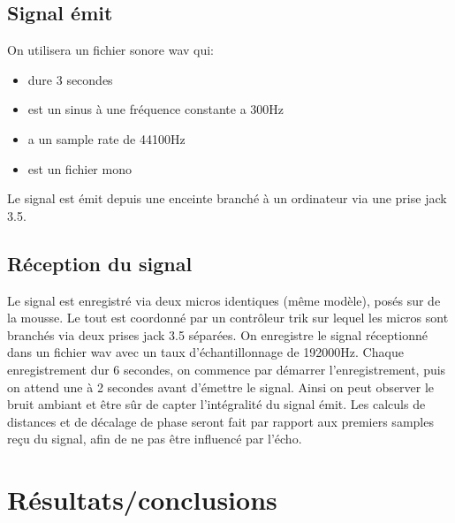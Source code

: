 \documentclass[12pt,a4paper]{article}
\begin{document}
\subsection{Signal émit}
On utilisera un fichier sonore wav qui:
\begin{itemize}
\item dure 3 secondes
\item est un sinus à une fréquence constante a 300Hz
\item a un sample rate de 44100Hz
\item est un fichier mono
\end{itemize}
Le signal est émit depuis une enceinte branché à un ordinateur via une prise jack 3.5.



\subsection{Réception du signal}
Le signal est enregistré via deux micros identiques (même modèle), posés sur de la mousse. Le tout est coordonné par un contrôleur trik sur lequel les micros sont branchés via deux prises jack 3.5 séparées.
On enregistre le signal réceptionné dans un fichier wav avec un taux d'échantillonnage de 192000Hz.
Chaque enregistrement dur 6 secondes, on commence par démarrer l'enregistrement, puis on attend une à 2 secondes avant d'émettre le signal. Ainsi on peut observer le bruit ambiant et être sûr de capter l'intégralité du signal émit.
Les calculs de distances et de décalage de phase seront fait par rapport aux premiers samples reçu du signal, afin de ne pas être influencé par l'écho.

\section{Résultats/conclusions}
\end{document}
